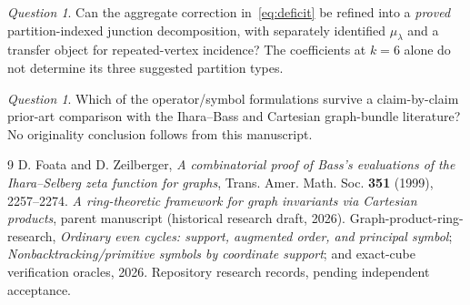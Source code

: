 \documentclass[11pt]{amsart}
\theoremstyle{definition}
\theoremstyle{remark}
\newtheorem{question}[theorem]{Question}
\begin{document}
\begin{question}
Can the aggregate correction in~\eqref{eq:deficit} be refined into a
\emph{proved} partition-indexed junction decomposition, with separately
identified $\mu_\lambda$ and a transfer object for repeated-vertex
incidence? The coefficients at $k=6$ alone do not determine its three
suggested partition types.
\end{question}
\begin{question}
Which of the operator/symbol formulations survive a claim-by-claim
prior-art comparison with the Ihara--Bass and Cartesian graph-bundle
literature? No originality conclusion follows from this manuscript.
\end{question}

\begin{thebibliography}{9}
D. Foata and D. Zeilberger, \emph{A combinatorial proof of Bass's
evaluations of the Ihara--Selberg zeta function for graphs},
Trans. Amer. Math. Soc. \textbf{351} (1999), 2257--2274.
\emph{A ring-theoretic framework for graph invariants via Cartesian
products}, parent manuscript (historical research draft, 2026).
Graph-product-ring-research, \emph{Ordinary even cycles: support,
augmented order, and principal symbol}; \emph{Nonbacktracking/primitive
symbols by coordinate support}; and exact-cube verification oracles,
2026. Repository research records, pending independent acceptance.
\end{thebibliography}
\end{document}
